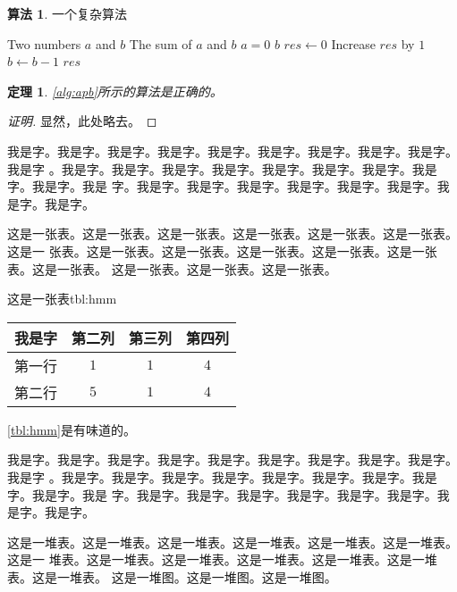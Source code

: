 \documentclass[supercite]{HustGraduPaper}
\newcommand{\ralg}[1]{\autoref{alg:#1}}
\newcommand{\rtbl}[1]{\autoref{tbl:#1}}
\newtheorem{thm}{定理}[section]
\theoremstyle{definition}
\newtheorem{alg}{算法}[section]
\begin{document}
\begin{shaded*}\begin{alg}{一个复杂算法}
  \label{alg:apb}
  \begin{algorithmic}
    \Input Two numbers $a$ and $b$
    \Output The sum of $a$ and $b$
      \If $a = 0$
        \State \Return $b$
      \EndIf
      \State $res \gets 0$
        \State Increase $res$ by $1$
        \State $b \gets b - 1$
      \EndWhile
      \State \Return $res$
    \EndProcedure
  \end{algorithmic}
\end{alg}\end{shaded*}

\begin{thm} \label{thm:gsb-apprx}
  \ralg{apb}所示的算法是正确的。
\end{thm}
\begin{proof}[证明]
  显然，此处略去。
\end{proof}

我是字。我是字。我是字。我是字。我是字。我是字。我是字。我是字。我是字。我是字
。我是字。我是字。我是字。我是字。我是字。我是字。我是字。我是字。我是字。我是
字。我是字。我是字。我是字。我是字。我是字。我是字。我是字。我是字。


这是一张表。这是一张表。这是一张表。这是一张表。这是一张表。这是一张表。这是一
张表。这是一张表。这是一张表。这是一张表。这是一张表。这是一张表。这是一张表。
这是一张表。这是一张表。这是一张表。

\begin{generaltab}{这是一张表}{tbl:hmm}
  \begin{tabular}{c|ccc}
    \toprule
    我是字 & 第二列 & 第三列 & 第四列 \\
    \midrule
    第一行 & $1$ & $1$ & $4$ \\
    第二行 & $5$ & $1$ & $4$ \\
    \bottomrule
  \end{tabular}
\end{generaltab}

\rtbl{hmm}是有味道的。

我是字。我是字。我是字。我是字。我是字。我是字。我是字。我是字。我是字。我是字
。我是字。我是字。我是字。我是字。我是字。我是字。我是字。我是字。我是字。我是
字。我是字。我是字。我是字。我是字。我是字。我是字。我是字。我是字。


这是一堆表。这是一堆表。这是一堆表。这是一堆表。这是一堆表。这是一堆表。这是一
堆表。这是一堆表。这是一堆表。这是一堆表。这是一堆表。这是一堆表。这是一堆表。
这是一堆图。这是一堆图。这是一堆图。
\end{document}
